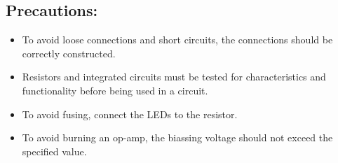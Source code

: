  \subsection{Precautions:}
        \begin{itemize}
            \item To avoid loose connections and short circuits, the connections should be correctly constructed.
            \item Resistors and integrated circuits must be tested for characteristics and functionality before being used in a circuit.
            \item To avoid fusing, connect the LEDs to the resistor.
            \item To avoid burning an op-amp, the biassing voltage should not exceed the specified value.
        \end{itemize}
 
 